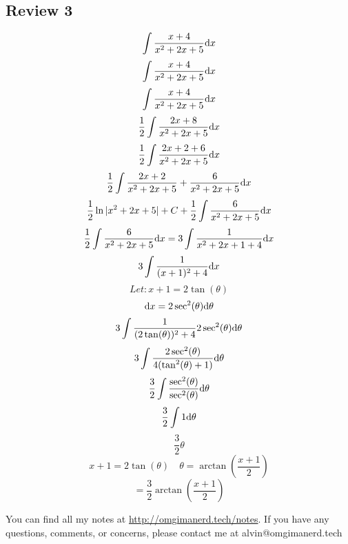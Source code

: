 \documentclass{math}
\begin{document}
\subsection*{Review 3}
\[ \int{\frac{x+4}{x^{2}+2x+5}\mathrm{d}{x}} \]
\[ \int{\frac{x+4}{x^{2}+2x+5}\mathrm{d}{x}} \]
\[ \int{\frac{x+4}{x^{2}+2x+5}\mathrm{d}{x}} \]
\[ \frac{1}{2}\int{\frac{2x+8}{x^{2}+2x+5}\mathrm{d}{x}} \]
\[ \frac{1}{2}\int{\frac{2x+2+6}{x^{2}+2x+5}\mathrm{d}{x}} \]
\[ \frac{1}{2}\int{\frac{2x+2}{x^{2}+2x+5}+\frac{6}{x^{2}+2x+5}\mathrm{d}{x}} \]
\[ \frac{1}{2}\ln|x^{2}+2x+5|+C+\frac{1}{2}\int{\frac{6}{x^{2}+2x+5}\mathrm{d}{x}} \]
\[ \frac{1}{2}\int{\frac{6}{x^{2}+2x+5}\mathrm{d}{x}} =
   3\int{\frac{1}{x^{2}+2x+1+4}\mathrm{d}{x}} \]
\[ 3\int{\frac{1}{(x+1)^{2}+4}\mathrm{d}{x}} \]
\[ Let: x+1 = 2\tan(\theta) \]
\[ \mathrm{d}{x} = 2\sec^{2}(\theta)\mathrm{d}{\theta} \]
\[ 3\int{\frac{1}{(2\tan(\theta))^{2}+4}2\sec^{2}(\theta)\mathrm{d}{\theta}} \]
\[ 3\int{\frac{2\sec^{2}(\theta)}{4(\tan^{2}(\theta)+1)}\mathrm{d}{\theta}} \]
\[ \frac{3}{2}\int{\frac{\sec^{2}(\theta)}{\sec^{2}(\theta)}\mathrm{d}{\theta}} \]
\[ \frac{3}{2}\int{1\mathrm{d}{\theta}} \]
\[ \frac{3}{2}\theta \]
\[ x+1 = 2\tan(\theta) \quad \theta = \arctan(\frac{x+1}{2}) \]
\[ = \frac{3}{2}\arctan(\frac{x+1}{2}) \]

\begin{center}
  You can find all my notes at \url{http://omgimanerd.tech/notes}. If you have
  any questions, comments, or concerns, please contact me at
  alvin@omgimanerd.tech
\end{center}
\end{document}
